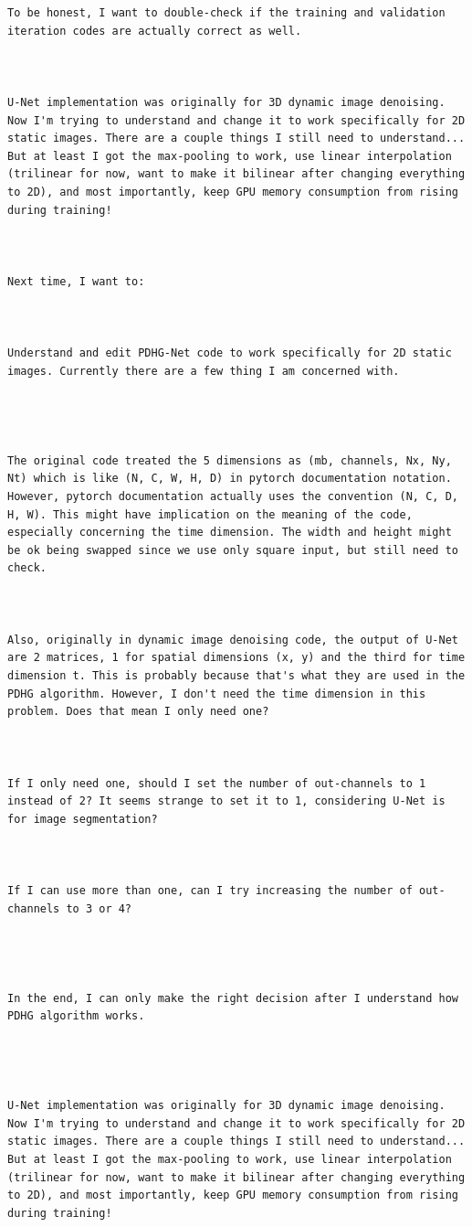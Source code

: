 \documentclass[12pt]{article}
\begin{document}
\begin{verbatim}
To be honest, I want to double-check if the training and validation iteration codes are actually correct as well.



U-Net implementation was originally for 3D dynamic image denoising. Now I'm trying to understand and change it to work specifically for 2D static images. There are a couple things I still need to understand... But at least I got the max-pooling to work, use linear interpolation (trilinear for now, want to make it bilinear after changing everything to 2D), and most importantly, keep GPU memory consumption from rising during training!



Next time, I want to:



Understand and edit PDHG-Net code to work specifically for 2D static images. Currently there are a few thing I am concerned with.




The original code treated the 5 dimensions as (mb, channels, Nx, Ny, Nt) which is like (N, C, W, H, D) in pytorch documentation notation. However, pytorch documentation actually uses the convention (N, C, D, H, W). This might have implication on the meaning of the code, especially concerning the time dimension. The width and height might be ok being swapped since we use only square input, but still need to check.



Also, originally in dynamic image denoising code, the output of U-Net are 2 matrices, 1 for spatial dimensions (x, y) and the third for time dimension t. This is probably because that's what they are used in the PDHG algorithm. However, I don't need the time dimension in this problem. Does that mean I only need one?



If I only need one, should I set the number of out-channels to 1 instead of 2? It seems strange to set it to 1, considering U-Net is for image segmentation?



If I can use more than one, can I try increasing the number of out-channels to 3 or 4?




In the end, I can only make the right decision after I understand how PDHG algorithm works.




U-Net implementation was originally for 3D dynamic image denoising. Now I'm trying to understand and change it to work specifically for 2D static images. There are a couple things I still need to understand... But at least I got the max-pooling to work, use linear interpolation (trilinear for now, want to make it bilinear after changing everything to 2D), and most importantly, keep GPU memory consumption from rising during training!



\end{verbatim}
\end{document}
